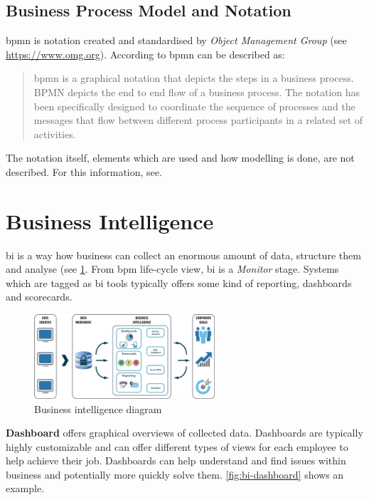 
\subsection{Business Process Model and Notation}
\gls{bpmn} is notation created and standardised by \textit{Object Management Group} (see \url{https://www.omg.org}). According to\cite{bpmn-org-2018} \gls{bpmn} can be described as:
\begin{quote}
  \gls{bpmn} is a graphical notation that depicts the steps in a business process. BPMN depicts the end to end flow of a business process. The notation has been specifically designed to coordinate the sequence of processes and the messages that flow between different process participants in a related set of activities.
\end{quote}
The notation itself, elements which are used and how modelling is done, are not described. For this information, see\cite{bpmn-org-2018}.

\section{Business Intelligence}

\gls{bi} is a way how business can collect an enormous amount of data, structure them and analyse (see \cref{fig:bi-diagram}. From \gls{bpm} life-cycle view, \gls{bi} is a \textit{Monitor} stage. Systems which are tagged as \gls{bi} tools typically offers some kind of reporting, dashboards and scorecards. 

\begin{figure}[ht!]
	\centering
    \includegraphics[width=0.6\textwidth]{img/mortgage-business-intelligence-diagram.png}
    \caption{Business intelligence diagram\cite{business-intelligence-diagram-2018}}
    \label{fig:bi-diagram}
\end{figure}

\textbf{Dashboard} offers graphical overviews of collected data. Dashboards are typically highly customizable and can offer different types of views for each employee to help achieve their job. Dashboards can help understand and find issues within business and potentially more quickly solve them. \cref{fig:bi-dashboard} shows an example. 

